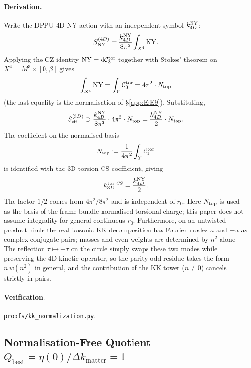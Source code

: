 \paragraph{Derivation.}
Write the DPPU 4D NY action with an independent symbol $k_{4D}^{\mathrm{NY}}$:
\begin{equation}
  S_{\mathrm{NY}}^{(4D)} = \frac{k_{4D}^{\mathrm{NY}}}{8\pi^2}\int_{X^4}\mathrm{NY}.
\end{equation}
Applying the CZ identity $\mathrm{NY} = \mathrm{d}\mathcal{C}_3^{\mathrm{tor}}$ together with Stokes'
theorem on $X^4 = M^3\times[0,\beta]$ gives
\begin{equation}
  \int_{X^4}\mathrm{NY} = \int_Y \mathcal{C}_3^{\mathrm{tor}} = 4\pi^2\cdot N_{\mathrm{top}}
\end{equation}
(the last equality is the normalisation of \S\ref{app:E:E9}).
Substituting,
\begin{equation}
  S_{\mathrm{eff}}^{(3D)}\supset
  \frac{k_{4D}^{\mathrm{NY}}}{8\pi^2}\cdot 4\pi^2\cdot N_{\mathrm{top}}
  = \frac{k_{4D}^{\mathrm{NY}}}{2}\cdot N_{\mathrm{top}}.
\end{equation}
The coefficient on the normalised basis
\begin{equation}
  N_{\mathrm{top}} := \frac{1}{4\pi^2}\int_Y \mathcal{C}_3^{\mathrm{tor}}
\end{equation}
is identified with the 3D torsion-CS coefficient, giving
\begin{equation}
  k_{3D}^{\mathrm{tor\text{-}CS}} = \frac{k_{4D}^{\mathrm{NY}}}{2}.
\end{equation}
The factor $1/2$ comes from $4\pi^2/8\pi^2$ and is independent of $r_0$.
Here $N_{\mathrm{top}}$ is used as the basis of the frame-bundle-normalised torsional
charge; this paper does not assume integrality for general continuous
$r_0$.  Furthermore, on an untwisted product circle the real bosonic KK
decomposition has Fourier modes $n$ and $-n$ as complex-conjugate pairs;
masses and even weights are determined by $n^2$ alone.  The reflection
$\tau\mapsto -\tau$ on the circle simply swaps these two modes while
preserving the 4D kinetic operator, so the parity-odd residue takes the
form $n\,w(n^2)$ in general, and the contribution of the KK tower
($n\neq 0$) cancels strictly in pairs.

\paragraph{Verification.}
\texttt{proofs/kk\_normalization.py}.

\subsection{Normalisation-Free Quotient $Q_{\mathrm{best}} = \eta(0)/\Delta k_{\mathrm{matter}} = 1$}
\label{app:E:E12}

